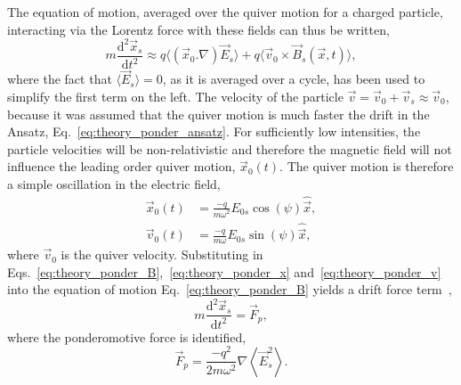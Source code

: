 The equation of motion, averaged over the quiver motion for a charged particle, interacting via the Lorentz force with these fields can thus be written,
\begin{equation}
    \label{eq:theory_ponder_eom}
    m \frac{\text{d}^2 \vec{x}_s}{\text{d}t^2} \approx q\langle \left( \vec{x}_0.\nabla \right) \vec{E}_s \rangle + q\langle \vec{v}_0\times \vec{B}_s(\vec{x},t) \rangle,
\end{equation}
where the fact that $\langle\vec{E}_s\rangle=0$, as it is averaged over a cycle, has been used to simplify the first term on the left.
The velocity of the particle $\vec{v}=\vec{v}_0 + \vec{v}_s \approx \vec{v}_0$, because it was assumed that the quiver motion is much faster the drift in the Ansatz, Eq.~\ref{eq:theory_ponder_ansatz}.
For sufficiently low intensities, the particle velocities will be non-relativistic and therefore the magnetic field will not influence the leading order quiver motion, $\vec{x}_0(t)$.
The quiver motion is therefore a simple oscillation in the electric field,
\begin{align}
    \label{eq:theory_ponder_x}
    \vec{x}_0(t) &= \frac{-q}{m \omega^2} E_{0s} \cos{\left(\psi\right)} \hat{\vec{x}},\\
    \label{eq:theory_ponder_v}
    \vec{v}_0(t) &= \frac{-q}{m \omega} E_{0s} \sin{\left(\psi\right)} \hat{\vec{x}},
\end{align}
where $\vec{v}_0$ is the quiver velocity.
Substituting in Eqs.~\ref{eq:theory_ponder_B},~\ref{eq:theory_ponder_x} and~\ref{eq:theory_ponder_v} into the equation of motion Eq.~\ref{eq:theory_ponder_B} yields a drift force term~\cite{michel_introduction_2023},
\begin{equation}
    \label{eq:theory_ponder_eom2}
    m \frac{\text{d}^2 \vec{x}_s}{\text{d}t^2} = \vec{F}_p,
\end{equation}
where the ponderomotive force is identified,
\begin{equation}
    \label{eq:theory_ponder_force}
    \vec{F}_p = \frac{-q^2}{2m\omega^2}\nabla \left\langle \vec{E}_s^2 \right\rangle.
\end{equation}


